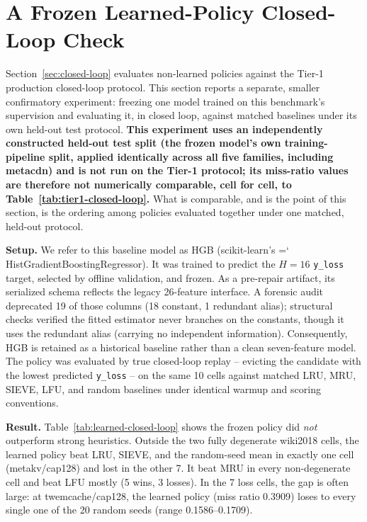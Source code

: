 \section{A Frozen Learned-Policy Closed-Loop Check}
\label{sec:learned-closed-loop}

\begin{sloppypar}
Section~\ref{sec:closed-loop} evaluates non-learned policies against the
Tier-1 production closed-loop protocol. This section reports a separate,
smaller confirmatory experiment: freezing one model trained on this
benchmark's supervision and evaluating it, in closed loop, against matched
baselines under its own held-out test protocol. \textbf{This experiment uses
an independently constructed held-out test split (the frozen model's own
training-pipeline split, applied identically across all five families,
including metacdn) and is not run on the Tier-1 protocol; its miss-ratio
values are therefore not numerically comparable, cell for cell, to
Table~\ref{tab:tier1-closed-loop}.} What is comparable, and is the point of
this section, is the ordering among policies evaluated together under one
matched, held-out protocol.
\end{sloppypar}

\textbf{Setup.} We refer to this baseline model as HGB (scikit-learn's
{\ttfamily\hyphenchar\font=`\- HistGradientBoostingRegressor}). It was trained to predict the $H=16$ \texttt{y\_loss} target, selected by offline validation, and frozen. As a pre-repair artifact, its serialized schema reflects the legacy 26-feature interface. A forensic audit deprecated 19 of those columns (18 constant, 1 redundant alias); structural checks verified the fitted estimator never branches on the constants, though it uses the redundant alias (carrying no independent information). Consequently, HGB is retained as a historical baseline rather than a clean seven-feature model. The policy was evaluated by true closed-loop replay -- evicting the candidate with the lowest predicted \texttt{y\_loss} -- on the same 10 cells against matched LRU, MRU, SIEVE, LFU, and random baselines under identical warmup and scoring conventions.



\textbf{Result.} Table~\ref{tab:learned-closed-loop} shows the frozen policy did \emph{not} outperform strong heuristics. Outside the two fully degenerate wiki2018 cells, the learned policy beat LRU, SIEVE, and the random-seed mean in exactly one cell (metakv/cap128) and lost in the other 7. It beat MRU in every non-degenerate cell and beat LFU mostly (5 wins, 3 losses). In the 7 loss cells, the gap is often large: at twemcache/cap128, the learned policy (miss ratio 0.3909) loses to every single one of the 20 random seeds (range 0.1586--0.1709).

